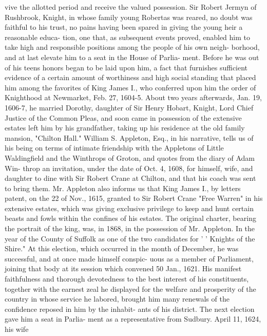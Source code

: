 \documentclass{book}
\begin{document}
vive the allotted period and receive the valued possession. Sir 
Robert Jermyn of Rushbrook, Knight, in whose family young 
Robertas was reared, no doubt was faithful to his trust, no pains 
having been spared in giving the young heir a reasonable educa- 
tion, one that, as subsequent events proved, enabled him to take 
high and responsible positions among the people of his own neigh- 
borhood, and at last elevate him to a seat in the House of Parlia- 
ment. Before he was out of his teens honors began to be laid 
upon him, a fact that furnishes sufficient evidence of a certain 
amount of worthiness and high social standing that placed him 
among the favorites of King James I., who conferred upon him 
the order of Knighthood at Newmarket, Feb. 27, 1604-5. About 
two years afterwards, Jan. 19, 1606-7, he married Dorothy, 
daughter of Sir Henry Hobart, Knight, Lord Chief Justice of the 
Common Pleas, and soon came in possession of the extensive 
estates left him by his grandfather, taking up his residence at the 
old family mansion, "Chilton Hall." William S. Appleton, 
Esq., in his narrative, tells us of his being on terms of intimate 
friendship with the Appletons of Little Waldingfield and the 
Winthrops of Groton, and quotes from the diary of Adam Win- 
throp an invitation, under the date of Oct. 4, 1608, for himself, 
wife, and daughter to dine with Sir Robert Crane at Chilton, and 
that his coach was sent to bring them. Mr. Appleton also 
informs us that King James I., by letters patent, on the 22 of 
Nov., 1615, granted to Sir Robert Crane "Free Warren" in his 
extensive estates, which was giving exclusive privilege to keep 
and hunt certain beasts and fowls within the confines of his 
estates. The original charter, bearing the portrait of the king, 
was, in 1868, in the possession of Mr. Appleton. In the year 
of the County of Suffolk as one of the two candidates for ' ' Knights 
of the Shire." At this election, which occurred in the month of 
December, he was successful, and at once made himself conspic- 
uous as a member of Parliament, joining that body at its session 
which convened 50 Jan., 1621. His manifest faithfulness and 
thorough devotedness to the best interest of his constituents, 
together with the earnest zeal he displayed for the welfare and 
prosperity of the country in whose service he labored, brought 
him many renewals of the confidence reposed in him by the inhabit- 
ants of his district. The next election gave him a seat in Parlia- 
ment as a representative from Sudbury. April 11, 1624, his wife 
\end{document}
